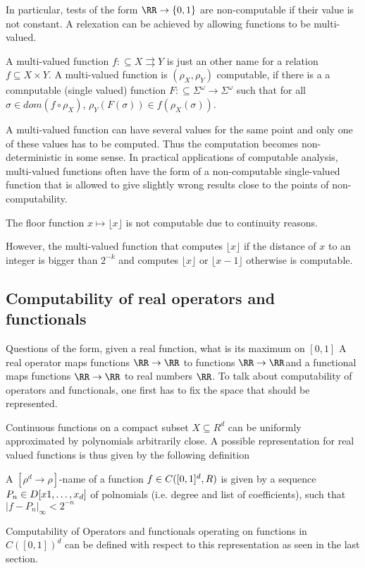 In particular, tests of the form $\RR \to \{0,1\}$ are non-computable if their
value is not constant. 
A relexation can be achieved by allowing functions to be multi-valued.
\begin{definition}
A multi-valued function $f: \subseteq X \rightrightarrows Y$ is just an other name for a relation $f \subseteq X \times Y$.
A multi-valued function is $(\rho_X, \rho_Y)$ computable, if there is a a comnputable (single valued) function 
$F: \subseteq \Sigma^\omega \to \Sigma^\omega$ such that for all $\sigma \in dom(f \circ \rho_X)$, $\rho_Y(F(\sigma)) \in f(\rho_X(\sigma))$. 
\end{definition}
A multi-valued function can have several values for the same point and only one
of these values has to be computed. 
Thus the computation becomes non-deterministic in some sense.
In practical applications of computable analysis, multi-valued functions often
have the form of a non-computable single-valued function that is allowed to
give slightly wrong results close to the points of non-computability.
\begin{example}
  The floor function $x \mapsto \lfloor x \rfloor$ is not computable due to
  continuity reasons.
  
  However, the multi-valued function that computes $\lfloor x \rfloor$ if the
  distance of $x$ to an integer is bigger than $2^{-k}$ and computes $\lfloor x
  \rfloor$ or $\lfloor x-1 \rfloor$ otherwise is computable.
\end{example}

\subsection{Computability of real operators and functionals}
Questions of the form, given a real function, what is its maximum on $[0,1]$ 
A real operator maps functions $\RR \to \RR$ to functions $\RR \to \RR$and a functional maps functions $\RR \to \RR$ to real numbers $\RR$.
To talk about computability of operators and functionals, one first has to fix
the space that should be represented.

Continuous functions on a compact subset $X \subseteq R^d$ can be uniformly approximated by polynomials arbitrarily close.
A possible representation for real valued functions is thus given by the following definition 
\begin{definition}
A $[\rho^d \to \rho]$-name of a function $f \in C([0,1]^d, \\R)$ is given by a
sequence $P_n \in \\D[x1, \dots, x_d]$ of polnomials (i.e. degree and list of
coefficients), such that $\vert f - P_n \vert_\infty < 2^{-n}$
\end{definition}
Computability of Operators and functionals operating on functions in
$C([0,1])^d$ can be defined with respect to this representation as seen in the
last section.

